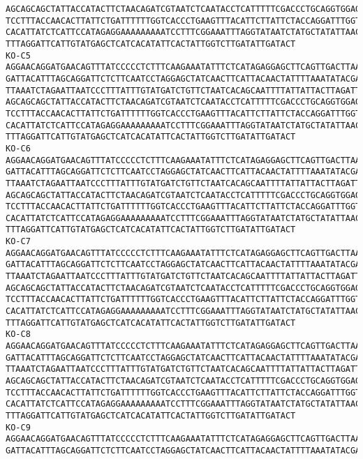 \documentclass[11pt]{article}
\begin{document}
\begin{Verbatim}[commandchars=\\\{\}]
AGCAGCAGCTATTACCATACTTCTAACAGATCGTAATCTCAATACCTCATTTTTCGACCCTGCAGGTGGAGGAGACCCAA
TCCTTTACCAACACTTATTCTGATTTTTTGGTCACCCTGAAGTTTACATTCTTATTCTACCAGGATTTGGTATTATTTCT
CACATTATCTCATTCCATAGAGGAAAAAAAAATCCTTTCGGAAATTTAGGTATAATCTATGCTATATTAACTATTGGAAT
TTTAGGATTCATTGTATGAGCTCATCACATATTCACTATTGGTCTTGATATTGATACT
KO-C5
AGGAACAGGATGAACAGTTTATCCCCCTCTTTCAAGAAATATTTCTCATAGAGGAGCTTCAGTTGACTTAAGAATCTTCA
GATTACATTTAGCAGGATTCTCTTCAATCCTAGGAGCTATCAACTTCATTACAACTATTTTAAATATACGACCAAAAAAC
TTAAATCTAGAATTAATCCCTTTATTTGTATGATCTGTTCTAATCACAGCAATTTTATTATTACTTAGATTACCAGTCTT
AGCAGCAGCTATTACCATACTTCTAACAGATCGTAATCTCAATACCTCATTTTTCGACCCTGCAGGTGGAGGAGACCCAA
TCCTTTACCAACACTTATTCTGATTTTTTGGTCACCCTGAAGTTTACATTCTTATTCTACCAGGATTTGGTATTATTTCT
CACATTATCTCATTCCATAGAGGAAAAAAAAATCCTTTCGGAAATTTAGGTATAATCTATGCTATATTAACTATTGGAAT
TTTAGGATTCATTGTATGAGCTCATCACATATTCACTATTGGTCTTGATATTGATACT
KO-C6
AGGAACAGGATGAACAGTTTATCCCCCTCTTTCAAGAAATATTTCTCATAGAGGAGCTTCAGTTGACTTAAGAATCTTCA
GATTACATTTAGCAGGATTCTCTTCAATCCTAGGAGCTATCAACTTCATTACAACTATTTTAAATATACGACCAAAAAAC
TTAAATCTAGAATTAATCCCTTTATTTGTATGATCTGTTCTAATCACAGCAATTTTATTATTACTTAGATTACCAGTCTT
AGCAGCAGCTATTACCATACTTCTAACAGATCGTAATCTCAATACCTCATTTTTCGACCCTGCAGGTGGAGGAGACCCAA
TCCTTTACCAACACTTATTCTGATTTTTTGGTCACCCTGAAGTTTACATTCTTATTCTACCAGGATTTGGTATTATTTCT
CACATTATCTCATTCCATAGAGGAAAAAAAAATCCTTTCGGAAATTTAGGTATAATCTATGCTATATTAACTATTGGAAT
TTTAGGATTCATTGTATGAGCTCATCACATATTCACTATTGGTCTTGATATTGATACT
KO-C7
AGGAACAGGATGAACAGTTTATCCCCCTCTTTCAAGAAATATTTCTCATAGAGGAGCTTCAGTTGACTTAAGAATCTTCA
GATTACATTTAGCAGGATTCTCTTCAATCCTAGGAGCTATCAACTTCATTACAACTATTTTAAATATACGACCAAAAAAC
TTAAATCTAGAATTAATCCCTTTATTTGTATGATCTGTTCTAATCACAGCAATTTTATTATTACTTAGATTACCAGTCTT
AGCAGCAGCTATTACCATACTTCTAACAGATCGTAATCTCAATACCTCATTTTTCGACCCTGCAGGTGGAGGAGACCCAA
TCCTTTACCAACACTTATTCTGATTTTTTGGTCACCCTGAAGTTTACATTCTTATTCTACCAGGATTTGGTATTATTTCT
CACATTATCTCATTCCATAGAGGAAAAAAAAATCCTTTCGGAAATTTAGGTATAATCTATGCTATATTAACTATTGGAAT
TTTAGGATTCATTGTATGAGCTCATCACATATTCACTATTGGTCTTGATATTGATACT
KO-C8
AGGAACAGGATGAACAGTTTATCCCCCTCTTTCAAGAAATATTTCTCATAGAGGAGCTTCAGTTGACTTAAGAATCTTCA
GATTACATTTAGCAGGATTCTCTTCAATCCTAGGAGCTATCAACTTCATTACAACTATTTTAAATATACGACCAAAAAAC
TTAAATCTAGAATTAATCCCTTTATTTGTATGATCTGTTCTAATCACAGCAATTTTATTATTACTTAGATTACCAGTCTT
AGCAGCAGCTATTACCATACTTCTAACAGATCGTAATCTCAATACCTCATTTTTCGACCCTGCAGGTGGAGGAGACCCAA
TCCTTTACCAACACTTATTCTGATTTTTTGGTCACCCTGAAGTTTACATTCTTATTCTACCAGGATTTGGTATTATTTCT
CACATTATCTCATTCCATAGAGGAAAAAAAAATCCTTTCGGAAATTTAGGTATAATCTATGCTATATTAACTATTGGAAT
TTTAGGATTCATTGTATGAGCTCATCACATATTCACTATTGGTCTTGATATTGATACT
KO-C9
AGGAACAGGATGAACAGTTTATCCCCCTCTTTCAAGAAATATTTCTCATAGAGGAGCTTCAGTTGACTTAAGAATCTTCA
GATTACATTTAGCAGGATTCTCTTCAATCCTAGGAGCTATCAACTTCATTACAACTATTTTAAATATACGACCAAAAAAC

\end{Verbatim}
\end{document}
